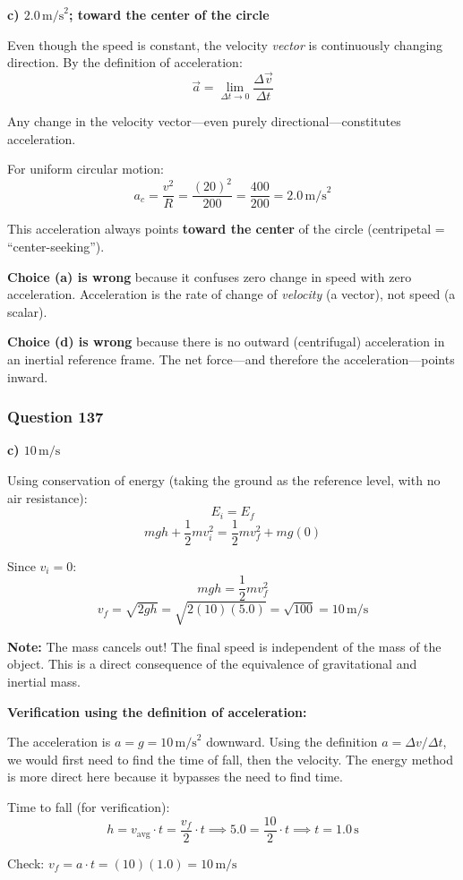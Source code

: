 \documentclass[12pt,letterpaper]{article}
\begin{document}
\begin{answerbox}
\textbf{c) $2.0\,\text{m/s}^2$; toward the center of the circle}
\end{answerbox}

\begin{explanationbox}
Even though the speed is constant, the velocity \emph{vector} is continuously changing direction. By the definition of acceleration:
\[
\vec{a} = \lim_{\Delta t \to 0} \frac{\Delta \vec{v}}{\Delta t}
\]

Any change in the velocity vector---even purely directional---constitutes acceleration.

For uniform circular motion:
\[
a_c = \frac{v^2}{R} = \frac{(20)^2}{200} = \frac{400}{200} = 2.0\,\text{m/s}^2
\]

This acceleration always points \textbf{toward the center} of the circle (centripetal = ``center-seeking'').

\textbf{Choice (a) is wrong} because it confuses zero change in speed with zero acceleration. Acceleration is the rate of change of \emph{velocity} (a vector), not speed (a scalar).

\textbf{Choice (d) is wrong} because there is no outward (centrifugal) acceleration in an inertial reference frame. The net force---and therefore the acceleration---points inward.
\end{explanationbox}

\subsubsection*{Question 137}

\begin{answerbox}
\textbf{c) $10\,\text{m/s}$}
\end{answerbox}

\begin{explanationbox}
Using conservation of energy (taking the ground as the reference level, with no air resistance):
\[
E_i = E_f
\]
\[
mgh + \frac{1}{2}mv_i^2 = \frac{1}{2}mv_f^2 + mg(0)
\]

Since $v_i = 0$:
\[
mgh = \frac{1}{2}mv_f^2
\]
\[
v_f = \sqrt{2gh} = \sqrt{2(10)(5.0)} = \sqrt{100} = 10\,\text{m/s}
\]

\textbf{Note:} The mass cancels out! The final speed is independent of the mass of the object. This is a direct consequence of the equivalence of gravitational and inertial mass.

\textbf{Verification using the definition of acceleration:}

The acceleration is $a = g = 10\,\text{m/s}^2$ downward. Using the definition $a = \Delta v / \Delta t$, we would first need to find the time of fall, then the velocity. The energy method is more direct here because it bypasses the need to find time.

Time to fall (for verification):
\[
h = v_{\text{avg}} \cdot t = \frac{v_f}{2} \cdot t \implies 5.0 = \frac{10}{2} \cdot t \implies t = 1.0\,\text{s}
\]

Check: $v_f = a \cdot t = (10)(1.0) = 10\,\text{m/s}$ \checkmark
\end{explanationbox}
\end{document}
